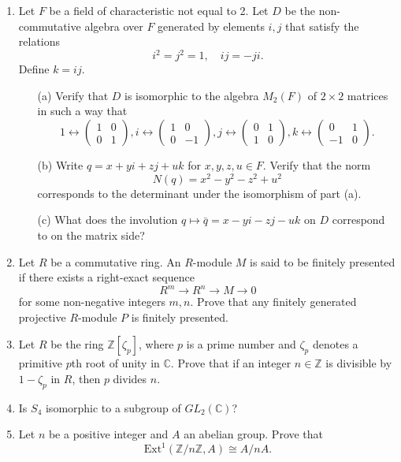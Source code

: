 \documentclass{article}
\begin{document}
\begin{enumerate}
    \item Let \(F\) be a field of characteristic not equal to 2. Let \(D\) be the non-commutative algebra over \(F\) generated by elements \(i,j\) that satisfy the relations
    \[i^2 = j^2 = 1, \quad ij = -ji.\]
    Define \(k = ij.\)
    \begin{itemize}
        \item[(a)] Verify that \(D\) is isomorphic to the algebra \(M_2(F)\) of \(2 \times 2\) matrices in such a way that
        \[1 \leftrightarrow \begin{pmatrix} 1 & 0 \\ 0 & 1 \end{pmatrix}, i \leftrightarrow \begin{pmatrix} 1 & 0 \\ 0 & -1 \end{pmatrix}, j \leftrightarrow \begin{pmatrix} 0 & 1 \\ 1 & 0 \end{pmatrix}, k \leftrightarrow \begin{pmatrix} 0 & 1 \\ -1 & 0 \end{pmatrix}.\]
        \item[(b)] Write \(q = x + yi + zj + uk\) for \(x,y,z,u \in F\). Verify that the norm
        \[N(q) = x^2 - y^2 - z^2 + u^2\]
        corresponds to the determinant under the isomorphism of part (a).
        \item[(c)] What does the involution \(q \mapsto \bar{q} = x - yi - zj - uk\) on \(D\) correspond to on the matrix side?
    \end{itemize}

    \item Let \(R\) be a commutative ring. An \(R\)-module \(M\) is said to be finitely presented if there exists a right-exact sequence
    \[R^m \longrightarrow R^n \longrightarrow M \longrightarrow 0\]
    for some non-negative integers \(m,n\). Prove that any finitely generated projective \(R\)-module \(P\) is finitely presented.

    \item Let \(R\) be the ring \(\mathbb{Z}[\zeta_p]\), where \(p\) is a prime number and \(\zeta_p\) denotes a primitive \(p\)th root of unity in \(\mathbb{C}\). Prove that if an integer \(n \in \mathbb{Z}\) is divisible by \(1 - \zeta_p\) in \(R\), then \(p\) divides \(n\).

    \item Is \(S_4\) isomorphic to a subgroup of \(GL_2(\mathbb{C})\)?

    \item Let \(n\) be a positive integer and \(A\) an abelian group. Prove that
    \[\text{Ext}^1(\mathbb{Z}/n\mathbb{Z}, A) \cong A/nA.\]
\end{enumerate}
\end{document}
